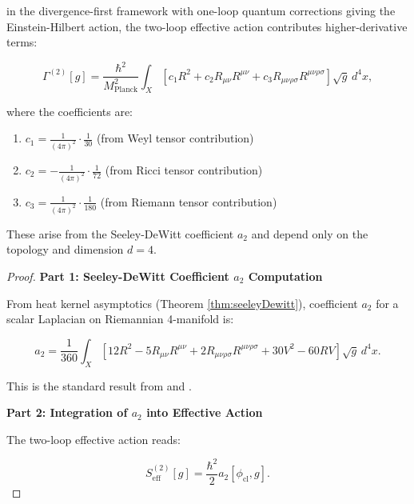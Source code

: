 \begin{theorem}
\label{thm:twoLoopEffectiveAction}

in the divergence-first framework with one-loop quantum corrections giving the Einstein-Hilbert action, the two-loop effective action contributes higher-derivative terms:

\begin{equation}
\Gamma^{(2)}[g] = \frac{\hbar^2}{M_{\text{Planck}}^2} \int_X [c_1 R^2 + c_2 R_{\mu\nu}R^{\mu\nu} + c_3 R_{\mu\nu\rho\sigma}R^{\mu\nu\rho\sigma}] \sqrt{g} \, d^4x,
\end{equation}

where the coefficients are:

\begin{enumerate}
\item $c_1 = \frac{1}{(4\pi)^2} \cdot \frac{1}{30}$ (from Weyl tensor contribution)
\item $c_2 = -\frac{1}{(4\pi)^2} \cdot \frac{1}{72}$ (from Ricci tensor contribution)
\item $c_3 = \frac{1}{(4\pi)^2} \cdot \frac{1}{180}$ (from Riemann tensor contribution)
\end{enumerate}

These arise from the Seeley-DeWitt coefficient $a_2$ and depend only on the topology and dimension $d = 4$.

\begin{proof}

\textbf{Part 1: Seeley-DeWitt Coefficient $a_2$ Computation}

From heat kernel asymptotics (Theorem \ref{thm:seeleyDewitt}), coefficient $a_2$ for a scalar Laplacian on Riemannian 4-manifold is:

\begin{equation}
a_2 = \frac{1}{360} \int_X [12R^2 - 5R_{\mu\nu}R^{\mu\nu} + 2R_{\mu\nu\rho\sigma}R^{\mu\nu\rho\sigma} + 30V^2 - 60RV] \sqrt{g} \, d^4x.
\end{equation}

This is the standard result from \cite{birrell1982quantum} and \cite{vassilevich2003heat}.

\textbf{Part 2: Integration of $a_2$ into Effective Action}

The two-loop effective action reads:

\begin{equation}
S_{\text{eff}}^{(2)}[g] = \frac{\hbar^2}{2} a_2[\phi_{\text{cl}}, g].
\end{equation}


\end{proof}
\end{theorem}
